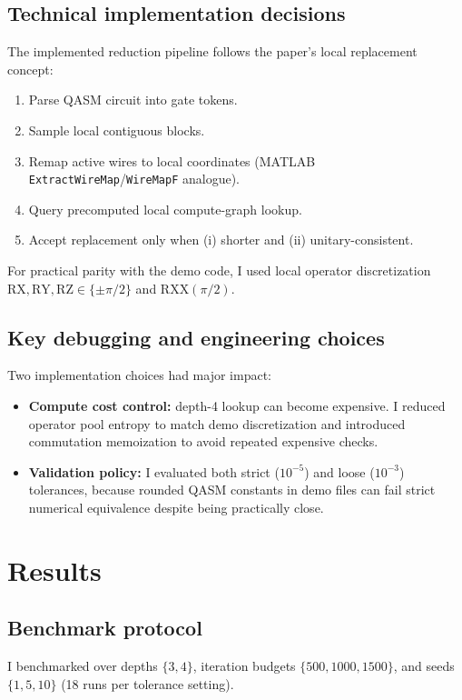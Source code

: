 \documentclass[11pt,a4paper]{article}
\begin{document}
\subsection{Technical implementation decisions}
The implemented reduction pipeline follows the paper's local replacement concept:
\begin{enumerate}
    \item Parse QASM circuit into gate tokens.
    \item Sample local contiguous blocks.
    \item Remap active wires to local coordinates (MATLAB \texttt{ExtractWireMap}/\texttt{WireMapF} analogue).
    \item Query precomputed local compute-graph lookup.
    \item Accept replacement only when (i) shorter and (ii) unitary-consistent.
\end{enumerate}
For practical parity with the demo code, I used local operator discretization
$\mathrm{RX},\mathrm{RY},\mathrm{RZ}\in\{\pm\pi/2\}$ and $\mathrm{RXX}(\pi/2)$.

\subsection{Key debugging and engineering choices}
Two implementation choices had major impact:
\begin{itemize}
    \item \textbf{Compute cost control:} depth-4 lookup can become expensive. I reduced operator pool entropy to match demo discretization and introduced commutation memoization to avoid repeated expensive checks.
    \item \textbf{Validation policy:} I evaluated both strict ($10^{-5}$) and loose ($10^{-3}$) tolerances, because rounded QASM constants in demo files can fail strict numerical equivalence despite being practically close.
\end{itemize}

\section{Results}
\subsection{Benchmark protocol}
I benchmarked over depths $\{3,4\}$, iteration budgets $\{500,1000,1500\}$, and seeds $\{1,5,10\}$ (18 runs per tolerance setting).
\end{document}
